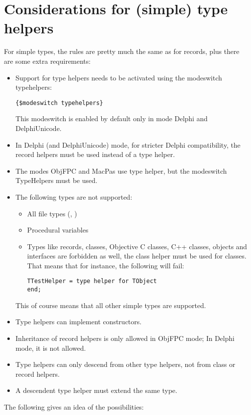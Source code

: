 \section{Considerations for (simple) type helpers}
For simple types, the rules are pretty much the same as for records, plus there are some extra requirements:
\begin{itemize}
\item Support for type helpers needs to be activated using the modeswitch typehelpers:
\begin{verbatim}
{$modeswitch typehelpers} 
\end{verbatim}
This modeswitch is enabled by default only in mode Delphi and DelphiUnicode.
\item In Delphi (and DelphiUnicode) mode, for stricter Delphi compatibility, the record helpers must be used instead 
of a type helper. 
\item The modes ObjFPC and MacPas use type helper, but the modeswitch TypeHelpers must be used. 
\item The following types are not supported:
\begin{itemize}
\item All file types (, )
\item Procedural variables
\item Types like records, classes, Objective C classes, C++ classes, objects and interfaces are forbidden as well, 
the class helper must be used for classes. That means that for instance, the following will fail:
\begin{verbatim}
TTestHelper = type helper for TObject
end;
\end{verbatim}
\end{itemize}
This of course means that all other simple types are supported.
\item Type helpers can implement constructors.
\item Inheritance of record helpers is only allowed in ObjFPC mode; In Delphi mode, it is not allowed.
\item Type helpers can only descend from other type helpers, not from class or record helpers.
\item A descendent type helper must extend the same type.
\end{itemize}
The following gives an idea of the possibilities:
